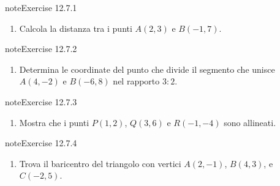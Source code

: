 \documentclass[letterpaper,10pt,italian]{jupyterBook}
\begin{document}
\begin{sphinxadmonition}{note}{Exercise 12.7.1}


\begin{enumerate}
%
\item {} 
\sphinxAtStartPar
Calcola la distanza tra i punti \( A(2, 3) \) e \( B(-1, 7) \).

\end{enumerate}
\end{sphinxadmonition}
 \label{exercise:ch/analytic_geometry/analytic_geometry_2d/problems-exercise-1}

\begin{sphinxadmonition}{note}{Exercise 12.7.2}


\begin{enumerate}
%
\setcounter{enumi}{1}
\item {} 
\sphinxAtStartPar
Determina le coordinate del punto che divide il segmento che unisce \( A(4, -2) \) e \( B(-6, 8) \) nel rapporto \( 3:2 \).

\end{enumerate}
\end{sphinxadmonition}
 \label{exercise:ch/analytic_geometry/analytic_geometry_2d/problems-exercise-2}

\begin{sphinxadmonition}{note}{Exercise 12.7.3}


\begin{enumerate}
%
\setcounter{enumi}{2}
\item {} 
\sphinxAtStartPar
Mostra che i punti \( P(1, 2) \), \( Q(3, 6) \) e \( R(-1, -4) \) sono allineati.

\end{enumerate}
\end{sphinxadmonition}
 \label{exercise:ch/analytic_geometry/analytic_geometry_2d/problems-exercise-3}

\begin{sphinxadmonition}{note}{Exercise 12.7.4}


\begin{enumerate}
%
\setcounter{enumi}{3}
\item {} 
\sphinxAtStartPar
Trova il baricentro del triangolo con vertici \( A(2, -1) \), \( B(4, 3) \), e \( C(-2, 5) \).

\end{enumerate}
\end{sphinxadmonition}
 \label{exercise:ch/analytic_geometry/analytic_geometry_2d/problems-exercise-4}
\end{document}
